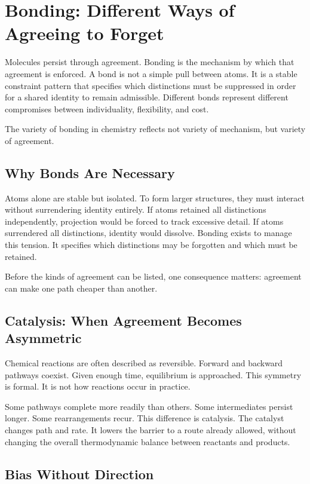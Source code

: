 \documentclass[11pt,twoside,openright]{book}
\begin{document}
\chapter{Bonding: Different Ways of Agreeing to Forget}

Molecules persist through agreement. Bonding is the mechanism by which that agreement is enforced. A bond is not a simple pull between atoms. It is a stable constraint pattern that specifies which distinctions must be suppressed in order for a shared identity to remain admissible. Different bonds represent different compromises between individuality, flexibility, and cost.

The variety of bonding in chemistry reflects not variety of mechanism, but variety of agreement.

\section*{Why Bonds Are Necessary}

Atoms alone are stable but isolated. To form larger structures, they must interact without surrendering identity entirely. If atoms retained all distinctions independently, projection would be forced to track excessive detail. If atoms surrendered all distinctions, identity would dissolve. Bonding exists to manage this tension. It specifies which distinctions may be forgotten and which must be retained.

Before the kinds of agreement can be listed, one consequence matters: agreement can make one path cheaper than another.

\section*{Catalysis: When Agreement Becomes Asymmetric}

Chemical reactions are often described as reversible. Forward and backward pathways coexist. Given enough time, equilibrium is approached. This symmetry is formal. It is not how reactions occur in practice.

Some pathways complete more readily than others. Some intermediates persist longer. Some rearrangements recur. This difference is catalysis. The catalyst changes path and rate. It lowers the barrier to a route already allowed, without changing the overall thermodynamic balance between reactants and products.

\section*{Bias Without Direction}
\end{document}
